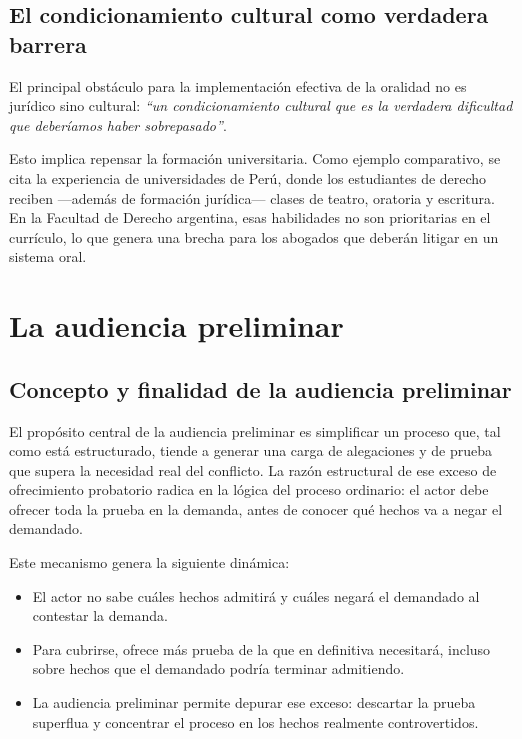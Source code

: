 \documentclass[12pt,oneside]{book}
\begin{document}
\section{El condicionamiento cultural como verdadera barrera}

El principal obstáculo para la implementación efectiva de la oralidad no es jurídico sino cultural: \textit{“un condicionamiento cultural que es la verdadera dificultad que deberíamos haber sobrepasado”}.

Esto implica repensar la formación universitaria. Como ejemplo comparativo, se cita la experiencia de universidades de Perú, donde los estudiantes de derecho reciben —además de formación jurídica— clases de teatro, oratoria y escritura. En la Facultad de Derecho argentina, esas habilidades no son prioritarias en el currículo, lo que genera una brecha para los abogados que deberán litigar en un sistema oral.

\chapter{La audiencia preliminar}

\section{Concepto y finalidad de la audiencia preliminar}

El propósito central de la audiencia preliminar es simplificar un proceso que, tal como está estructurado, tiende a generar una carga de alegaciones y de prueba que supera la necesidad real del conflicto. La razón estructural de ese exceso de ofrecimiento probatorio radica en la lógica del proceso ordinario: el actor debe ofrecer toda la prueba en la demanda, antes de conocer qué hechos va a negar el demandado.

Este mecanismo genera la siguiente dinámica:

\begin{itemize}
    \item El actor no sabe cuáles hechos admitirá y cuáles negará el demandado al contestar la demanda.
    \item Para cubrirse, ofrece más prueba de la que en definitiva necesitará, incluso sobre hechos que el demandado podría terminar admitiendo.
    \item La audiencia preliminar permite depurar ese exceso: descartar la prueba superflua y concentrar el proceso en los hechos realmente controvertidos.
\end{itemize}
\end{document}
